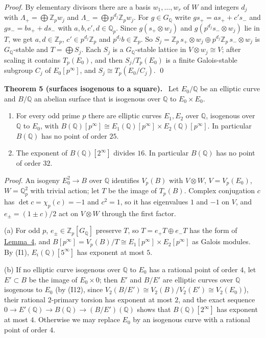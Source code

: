 \documentclass[11pt]{article}
\newenvironment{statement}[1]{\par\medskip\noindent\phantomsection\textbf{#1}\ }{\par\medskip}
\newcommand{\Q}{\mathbb Q}
\newcommand{\Z}{\mathbb Z}
\begin{document}
\emph{Proof.} By elementary divisors there are a basis \(w_1,\dots,w_r\) of \(W\) and integers \(d_j\) with
\(\Lambda_{+}=\bigoplus\Z_pw_j\) and \(\Lambda_{-}=\bigoplus p^{d_j}\Z_pw_j\). For \(g\in G_{\Q}\) write
\(gs_{+}=as_{+}+c's_{-}\) and \(gs_{-}=bs_{+}+ds_{-}\) with \(a,b,c',d\in\Q_p\). Since \(g(s_{+}\otimes w_j)\) and
\(g(p^{d_j}s_{-}\otimes w_j)\) lie in \(T\), we get \(a,d\in\Z_p\), \(c'\in p^{d_j}\Z_p\) and \(p^{d_j}b\in\Z_p\). So
\(S_j=\Z_p\,s_{+}\otimes w_j\oplus p^{d_j}\Z_p\,s_{-}\otimes w_j\) is \(G_{\Q}\)-stable and \(T=\bigoplus S_j\). Each
\(S_j\) is a \(G_{\Q}\)-stable lattice in \(V\otimes w_j\cong V\); after scaling it contains \(T_p(E_0)\), and then
\(S_j/T_p(E_0)\) is a finite Galois-stable subgroup \(C_j\) of \(E_0[p^\infty]\), and \(S_j\cong T_p(E_0/C_j)\).
\qed

\begin{statement}{Theorem 5 (surfaces isogenous to a square).}\label{thm-isotypic}
Let \(E_0/\Q\) be an elliptic curve and \(B/\Q\) an abelian surface that is isogenous over \(\Q\) to
\(E_0\times E_0\).
\begin{enumerate}
\item[(a)] For every odd prime \(p\) there are elliptic curves \(E_1,E_2\) over \(\Q\), isogenous over \(\Q\) to
\(E_0\), with \(B(\Q)[p^\infty]\cong E_1(\Q)[p^\infty]\times E_2(\Q)[p^\infty]\). In particular \(B(\Q)\) has no
point of order \(25\).
\item[(b)] The exponent of \(B(\Q)[2^\infty]\) divides \(16\). In particular \(B(\Q)\) has no point of order
\(32\).
\end{enumerate}
\end{statement}

\emph{Proof.} An isogeny \(E_0^2\to B\) over \(\Q\) identifies \(V_p(B)\) with \(V\otimes W\), \(V=V_p(E_0)\),
\(W=\Q_p^2\) with trivial action; let \(T\) be the image of \(T_p(B)\). Complex conjugation \(c\) has
\(\det c=\chi_p(c)=-1\) and \(c^2=1\), so it has eigenvalues \(1\) and \(-1\) on \(V\), and \(e_\pm=(1\pm c)/2\)
act on \(V\otimes W\) through the first factor.

(a) For odd \(p\), \(e_\pm\in\Z_p[G_{\Q}]\) preserve \(T\), so \(T=e_{+}T\oplus e_{-}T\) has the form of
\hyperref[lemma-lattices]{Lemma~4}, and \(B[p^\infty]=V_p(B)/T\cong E_1[p^\infty]\times E_2[p^\infty]\) as Galois
modules. By (I1), \(E_i(\Q)[5^\infty]\) has exponent at most \(5\).

(b) If no elliptic curve isogenous over \(\Q\) to \(E_0\) has a rational point of order \(4\), let \(E'\subset B\)
be the image of \(E_0\times0\); then \(E'\) and \(B/E'\) are elliptic curves over \(\Q\) isogenous to \(E_0\) (by
(I12), since \(V_2(B/E')\cong V_2(B)/V_2(E')\cong V_2(E_0)\)), their rational \(2\)-primary torsion has exponent at
most \(2\), and the exact sequence \(0\to E'(\Q)\to B(\Q)\to(B/E')(\Q)\) shows that \(B(\Q)[2^\infty]\) has
exponent at most \(4\). Otherwise we may replace \(E_0\) by an isogenous curve with a rational point of order \(4\).
\end{document}
